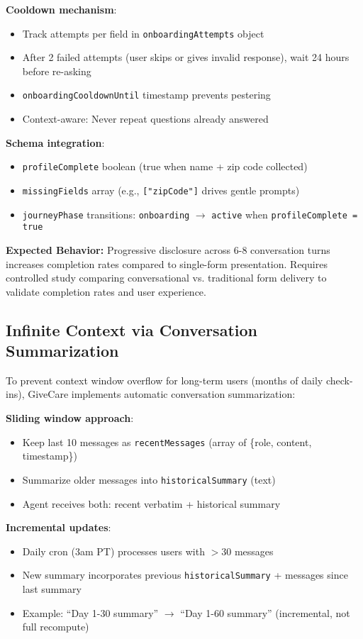 \documentclass{article}
\begin{document}
\textbf{Cooldown mechanism}:
\begin{itemize}
    \item Track attempts per field in \texttt{onboardingAttempts} object
    \item After 2 failed attempts (user skips or gives invalid response), wait 24 hours before re-asking
    \item \texttt{onboardingCooldownUntil} timestamp prevents pestering
    \item Context-aware: Never repeat questions already answered
\end{itemize}

\textbf{Schema integration}:
\begin{itemize}
    \item \texttt{profileComplete} boolean (true when name + zip code collected)
    \item \texttt{missingFields} array (e.g., \texttt{["zipCode"]} drives gentle prompts)
    \item \texttt{journeyPhase} transitions: \texttt{onboarding} $\rightarrow$ \texttt{active} when \texttt{profileComplete = true}
\end{itemize}

\textbf{Expected Behavior:} Progressive disclosure across 6-8 conversation turns increases completion rates compared to single-form presentation. Requires controlled study comparing conversational vs. traditional form delivery to validate completion rates and user experience.

%
\subsection{Infinite Context via Conversation Summarization}%
\label{subsec:InfiniteContextviaConversationSummarization}%
To prevent context window overflow for long-term users (months of daily check-ins), GiveCare implements automatic conversation summarization:

\textbf{Sliding window approach}:
\begin{itemize}
    \item Keep last 10 messages as \texttt{recentMessages} (array of \{role, content, timestamp\})
    \item Summarize older messages into \texttt{historicalSummary} (text)
    \item Agent receives both: recent verbatim + historical summary
\end{itemize}

\textbf{Incremental updates}:
\begin{itemize}
    \item Daily cron (3am PT) processes users with $>$30 messages
    \item New summary incorporates previous \texttt{historicalSummary} + messages since last summary
    \item Example: ``Day 1-30 summary'' $\rightarrow$ ``Day 1-60 summary'' (incremental, not full recompute)
\end{itemize}
\end{document}
